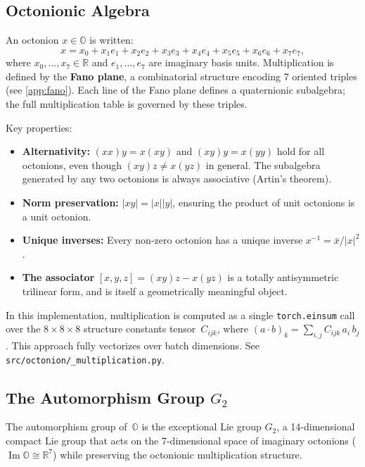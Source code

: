 \documentclass[11pt,a4paper]{article}
\DeclareMathOperator{\Ima}{Im}
\newcommand{\Oct}{\mathbb{O}}
\newcommand{\Real}{\mathbb{R}}
\begin{document}
\subsection{Octonionic Algebra}
\label{sec:octalgebra}

An octonion $x \in \Oct$ is written:
\begin{equation}
x = x_0 + x_1 e_1 + x_2 e_2 + x_3 e_3 + x_4 e_4 + x_5 e_5 + x_6 e_6 + x_7 e_7,
\end{equation}
where $x_0, \ldots, x_7 \in \Real$ and $e_1, \ldots, e_7$ are imaginary basis units. Multiplication is defined by the \textbf{Fano plane}, a combinatorial structure encoding 7 oriented triples (see \cref{app:fano}). Each line of the Fano plane defines a quaternionic subalgebra; the full multiplication table is governed by these triples.

Key properties:
\begin{itemize}[nosep]
  \item \textbf{Alternativity:} $(xx)y = x(xy)$ and $(xy)y = x(yy)$ hold for all octonions, even though $(xy)z \neq x(yz)$ in general. The subalgebra generated by any two octonions is always associative (Artin's theorem).
  \item \textbf{Norm preservation:} $\lvert xy \rvert = \lvert x \rvert \lvert y \rvert$, ensuring the product of unit octonions is a unit octonion.
  \item \textbf{Unique inverses:} Every non-zero octonion has a unique inverse $x^{-1} = \bar{x} / \lvert x \rvert^2$.
  \item \textbf{The associator} $[x,y,z] = (xy)z - x(yz)$ is a totally antisymmetric trilinear form, and is itself a geometrically meaningful object.
\end{itemize}

In this implementation, multiplication is computed as a single \texttt{torch.einsum} call over the $8 \times 8 \times 8$ structure constants tensor~$C_{ijk}$, where $(a \cdot b)_k = \sum_{i,j} C_{ijk}\, a_i\, b_j$. This approach fully vectorizes over batch dimensions. See \texttt{src/octonion/\_multiplication.py}.

\subsection{The Automorphism Group \texorpdfstring{$G_2$}{G2}}
\label{sec:g2}

The automorphism group of~$\Oct$ is the exceptional Lie group $G_2$, a 14-dimensional compact Lie group that acts on the 7-dimensional space of imaginary octonions ($\Ima\Oct \cong \Real^7$) while preserving the octonionic multiplication structure.
\end{document}
